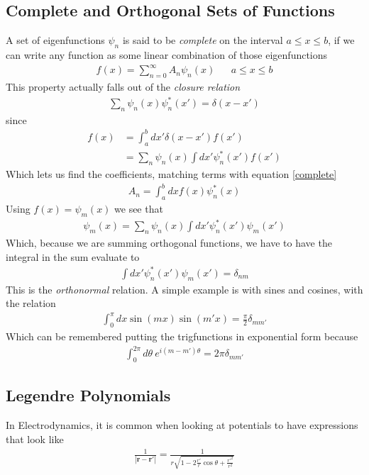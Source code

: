 \subsection{Complete and Orthogonal Sets of Functions}
A set of eigenfunctions $\psi_n$ is said to be \emph{complete} on the interval $a\le x\le b$, if we can write any function as some linear combination of those eigenfunctions 
\begin{align}\label{complete}
f(x) = \sum_{n=0}^\infty A_n \psi_n(x) && a\le x\le b
\end{align}
This property actually falls out of the \emph{closure relation}
\begin{align}
\sum_n \psi_n(x)\psi_n^*(x') = \delta(x-x')
\end{align}
since 
\begin{align}
f(x) &= \int_a^b dx' \delta(x-x')f(x')\\
&= \sum_n \psi_n(x) \int dx' \psi_n^*(x') f(x')
\end{align}
Which lets us find the coefficients, matching terms with equation \ref{complete}
\begin{align}
A_n = \int_{a}^b dx f(x)\psi^*_n(x)
\end{align}
Using $f(x) = \psi_m(x)$ we see that
\begin{align}
\psi_m(x) = \sum_n \psi_n(x) \int dx' \psi_n^*(x') \psi_m(x')
\end{align}
Which, because we are summing orthogonal functions, we have to have the integral in the sum evaluate to
\begin{align}
 \int dx' \psi_n^*(x') \psi_m(x') = \delta_{nm}
\end{align}
This is the \emph{orthonormal} relation. A simple example is with sines and cosines, with the relation
\begin{align}
\int_0^\pi dx\sin (mx)\sin (m'x) = \frac{\pi}{2}\delta_{mm'}
\end{align}
Which can be remembered putting the trigfunctions in exponential form because
\begin{align}
\int_0^{2\pi} d\theta~ e^{i(m-m')\theta} = 2\pi\delta_{mm'}
\end{align}




\subsection{Legendre Polynomials}\label{legendrepoly}
In Electrodynamics, it is common when looking at potentials to have expressions that look like
\begin{align}
\frac{1}{|\textbf{r} - \textbf{r}'|} = \frac{1}{r\sqrt{1-2\frac{r'}{r}\cos\theta + \frac{r'^2}{r^2}}}
\end{align}

